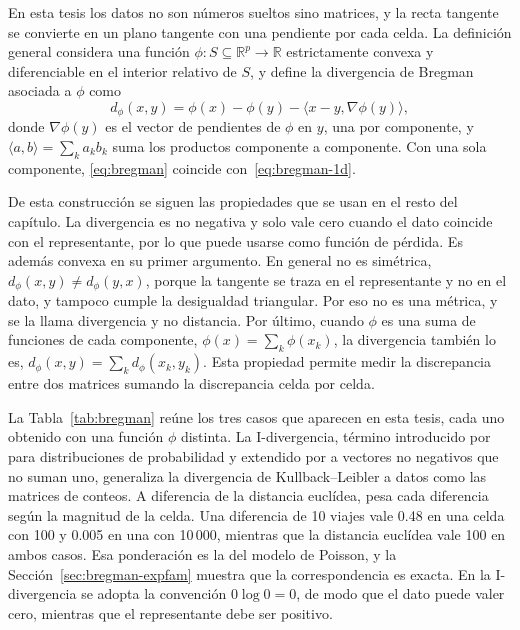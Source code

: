 En esta tesis los datos no son números sueltos sino matrices, y la recta
tangente se convierte en un plano tangente con una pendiente por cada celda. La
definición general \cite{Bregman1967} considera una función
$\phi : S \subseteq \mathbb{R}^p \to \mathbb{R}$ estrictamente convexa y
diferenciable en el interior relativo de $S$, y define la divergencia de Bregman
asociada a $\phi$ como
\begin{equation}\label{eq:bregman}
  d_\phi(x, y) = \phi(x) - \phi(y) - \langle x - y, \nabla\phi(y) \rangle ,
\end{equation}
donde $\nabla\phi(y)$ es el vector de pendientes de $\phi$ en $y$, una por
componente, y $\langle a, b \rangle = \sum_k a_k b_k$ suma los productos
componente a componente. Con una sola componente, \eqref{eq:bregman} coincide
con~\eqref{eq:bregman-1d}.

De esta construcción se siguen las propiedades que se usan en el resto del
capítulo. La divergencia es no negativa y solo vale cero cuando el dato coincide
con el representante, por lo que puede usarse como función de pérdida. Es además
convexa en su primer argumento. En general no es simétrica,
$d_\phi(x, y) \neq d_\phi(y, x)$, porque la tangente se traza en el
representante y no en el dato, y tampoco cumple la desigualdad triangular. Por
eso no es una métrica, y se la llama divergencia y no distancia. Por último,
cuando $\phi$ es una suma de funciones de cada componente,
$\phi(x) = \sum_k \phi(x_k)$, la divergencia también lo es,
$d_\phi(x, y) = \sum_k d_\phi(x_k, y_k)$. Esta propiedad permite medir la
discrepancia entre dos matrices sumando la discrepancia celda por celda.

La Tabla~\ref{tab:bregman} reúne los tres casos que aparecen en esta tesis, cada
uno obtenido con una función $\phi$ distinta. La I-divergencia, término
introducido por \cite{Csiszar1975} para distribuciones de probabilidad y extendido
por \cite{Csiszar1991} a vectores no negativos que no suman uno, generaliza la
divergencia de Kullback--Leibler a datos como las matrices de conteos. A
diferencia de la distancia euclídea, pesa cada diferencia según la magnitud de la
celda. Una diferencia de 10 viajes vale 0.48 en una celda con 100 y 0.005 en una
con 10\,000, mientras que la distancia euclídea vale 100 en ambos casos. Esa
ponderación es la del modelo de Poisson, y la
Sección~\ref{sec:bregman-expfam} muestra que la correspondencia es exacta. En la
I-divergencia se adopta la convención $0 \log 0 = 0$, de modo que el dato puede
valer cero, mientras que el representante debe ser positivo.

